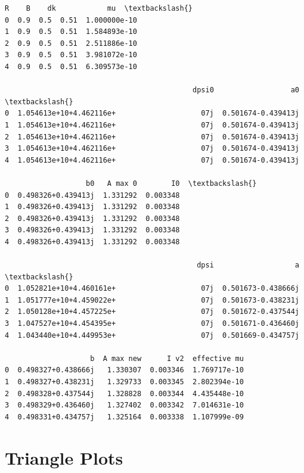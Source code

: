 \documentclass[11pt]{article}
\makeatletter
\newcommand{\boxspacing}{\kern\kvtcb@left@rule\kern\kvtcb@boxsep}
\newcommand{\prompt}[4]{
        {\ttfamily\llap{{\color{#2}[#3]:\hspace{3pt}#4}}\vspace{-\baselineskip}}
    }
\makeatother
\begin{document}
            \begin{tcolorbox}[breakable, size=fbox, boxrule=.5pt, pad at break*=1mm, opacityfill=0]
\prompt{Out}{outcolor}{20}{\boxspacing}
\begin{Verbatim}[commandchars=\\\{\}]
     R    B    dk            mu  \textbackslash{}
0  0.9  0.5  0.51  1.000000e-10
1  0.9  0.5  0.51  1.584893e-10
2  0.9  0.5  0.51  2.511886e-10
3  0.9  0.5  0.51  3.981072e-10
4  0.9  0.5  0.51  6.309573e-10

                                            dpsi0                  a0  \textbackslash{}
0  1.054613e+10+4.462116e+                    07j  0.501674-0.439413j
1  1.054613e+10+4.462116e+                    07j  0.501674-0.439413j
2  1.054613e+10+4.462116e+                    07j  0.501674-0.439413j
3  1.054613e+10+4.462116e+                    07j  0.501674-0.439413j
4  1.054613e+10+4.462116e+                    07j  0.501674-0.439413j

                   b0   A max 0        I0  \textbackslash{}
0  0.498326+0.439413j  1.331292  0.003348
1  0.498326+0.439413j  1.331292  0.003348
2  0.498326+0.439413j  1.331292  0.003348
3  0.498326+0.439413j  1.331292  0.003348
4  0.498326+0.439413j  1.331292  0.003348

                                             dpsi                   a  \textbackslash{}
0  1.052821e+10+4.460161e+                    07j  0.501673-0.438666j
1  1.051777e+10+4.459022e+                    07j  0.501673-0.438231j
2  1.050128e+10+4.457225e+                    07j  0.501672-0.437544j
3  1.047527e+10+4.454395e+                    07j  0.501671-0.436460j
4  1.043440e+10+4.449953e+                    07j  0.501669-0.434757j

                    b  A max new      I v2  effective mu
0  0.498327+0.438666j   1.330307  0.003346  1.769717e-10
1  0.498327+0.438231j   1.329733  0.003345  2.802394e-10
2  0.498328+0.437544j   1.328828  0.003344  4.435448e-10
3  0.498329+0.436460j   1.327402  0.003342  7.014631e-10
4  0.498331+0.434757j   1.325164  0.003338  1.107999e-09
\end{Verbatim}
\end{tcolorbox}
        
    \hypertarget{triangle-plots}{%
\section{Triangle Plots}\label{triangle-plots}}
\end{document}

